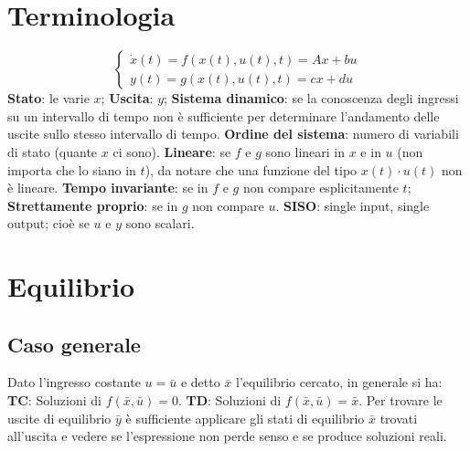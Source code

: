 
\fontsize{8pt}{10pt}\selectfont
{}
\begin{landscape}
\begin{multicols*}{3}
    \section{Terminologia}
    \[
        \begin{cases}
            \dot{x}(t) = f(x(t),u(t),t) = Ax + bu\\
            y(t) = g(x(t),u(t),t) = cx +du
        \end{cases}
    \]
    \textbf{Stato}: le varie $x$;\newline
    \textbf{Uscita}: $y$;\newline
    \textbf{Sistema dinamico}: se la conoscenza degli ingressi su un intervallo di tempo
    non è sufficiente per determinare l’andamento delle uscite sullo stesso intervallo di tempo.\newline
    \textbf{Ordine del sistema}: numero di variabili di stato (quante $x$ ci sono).\newline
    \textbf{Lineare}: se $f$ e $g$ sono lineari in $x$ e in $u$ (non importa che lo siano in $t$), da notare che una funzione del tipo $x(t) \cdot u(t)$ non è lineare.\newline
    \textbf{Tempo invariante}: se in $f$ e $g$ non compare esplicitamente $t$;\newline
    \textbf{Strettamente proprio}: se in $g$ non compare $u$.\newline
    \textbf{SISO}: single input, single output; cioè se $u$ e $y$ sono scalari.
    \section{Equilibrio}
    \subsection{Caso generale}
    Dato l'ingresso costante $u = \bar{u}$ e detto $\bar{x}$ l'equilibrio cercato, in generale si ha:\newline
    \textbf{TC}: Soluzioni di $f(\bar{x},\bar{u}) = 0$.\newline
    \textbf{TD}: Soluzioni di $f(\bar{x}, \bar{u}) = \bar{x}$.\newline
    Per trovare le uscite di equilibrio $\bar{y}$ è sufficiente applicare gli stati di equilibrio $\bar{x}$ trovati all'uscita e vedere se l'espressione non perde senso e se produce soluzioni reali.

\end{multicols*}
\end{landscape}
